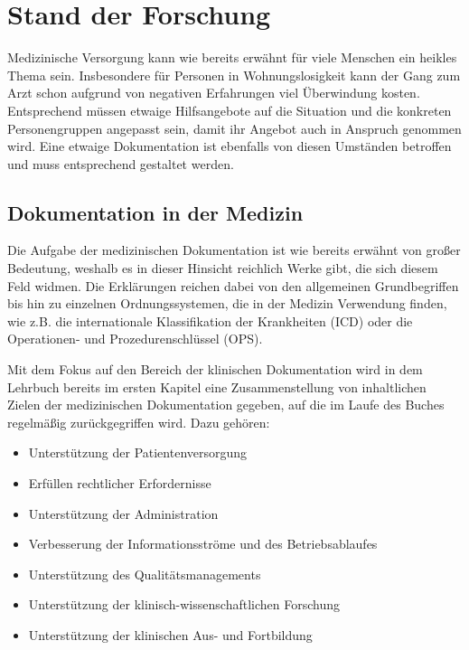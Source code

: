 \chapter{Stand der Forschung}\label{ch:relatedWork}

Medizinische Versorgung kann wie bereits erwähnt für viele Menschen ein heikles Thema sein. Insbesondere für Personen in Wohnungslosigkeit kann der Gang zum Arzt schon aufgrund von negativen Erfahrungen viel Überwindung kosten. Entsprechend müssen etwaige Hilfsangebote auf die Situation und die konkreten Personengruppen angepasst sein, damit ihr Angebot auch in Anspruch genommen wird. Eine etwaige Dokumentation ist ebenfalls von diesen Umständen betroffen und muss entsprechend gestaltet werden.

\section{Dokumentation in der Medizin}

Die Aufgabe der medizinischen Dokumentation ist wie bereits erwähnt von großer Bedeutung, weshalb es in dieser Hinsicht reichlich Werke gibt, die sich diesem Feld widmen. Die Erklärungen reichen dabei von den allgemeinen Grundbegriffen bis hin zu einzelnen Ordnungssystemen, die in der Medizin Verwendung finden, wie z.B. die internationale Klassifikation der Krankheiten (ICD) oder die Operationen- und Prozedurenschlüssel (OPS).

Mit dem Fokus auf den Bereich der klinischen Dokumentation wird in dem Lehrbuch \citet{Leiner.2012} bereits im ersten Kapitel eine Zusammenstellung von inhaltlichen Zielen der medizinischen Dokumentation gegeben, auf die im Laufe des Buches regelmäßig zurückgegriffen wird. Dazu gehören:

\begin{itemize}
	\item Unterstützung der Patientenversorgung
	\item Erfüllen rechtlicher Erfordernisse
	\item Unterstützung der Administration
	\item Verbesserung der Informationsströme und des Betriebsablaufes
	\item Unterstützung des Qualitätsmanagements
	\item Unterstützung der klinisch-wissenschaftlichen Forschung
	\item Unterstützung der klinischen Aus- und Fortbildung
\end{itemize}

